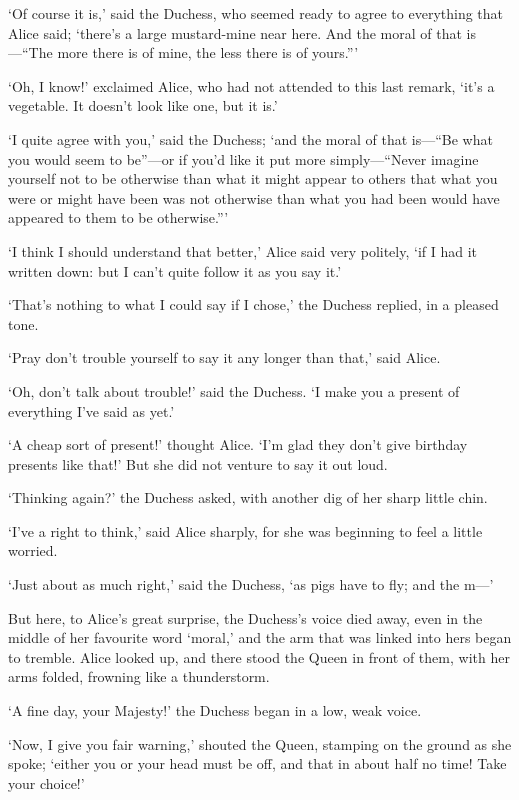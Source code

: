 \documentclass[12pt,openany]{memoir}
\begin{document}
`Of course it is,' said the Duchess, who seemed ready to agree to everything that Alice said; `there's a large mustard-mine near here. And the moral of that is---``The more there is of mine, the less there is of yours.'''

`Oh, I know!' exclaimed Alice, who had not attended to this last remark, `it's a vegetable. It doesn't look like one, but it is.'

`I quite agree with you,' said the Duchess; `and the moral of that is---``Be what you would seem to be''---or if you'd like it put more simply---``Never imagine yourself not to be otherwise than what it might appear to others that what you were or might have been was not otherwise than what you had been would have appeared to them to be otherwise.'''

`I think I should understand that better,' Alice said very politely, `if I had it written down: but I can't quite follow it as you say it.'

`That's nothing to what I could say if I chose,' the Duchess replied, in a pleased tone.

`Pray don't trouble yourself to say it any longer than that,' said Alice.

`Oh, don't talk about trouble!' said the Duchess. `I make you a present of everything I've said as yet.'

`A cheap sort of present!' thought Alice. `I'm glad they don't give birthday presents like that!' But she did not venture to say it out loud.

`Thinking again?' the Duchess asked, with another dig of her sharp little chin.

`I've a right to think,' said Alice sharply, for she was beginning to feel a little worried.

`Just about as much right,' said the Duchess, `as pigs have to fly; and the m---'

But here, to Alice's great surprise, the Duchess's voice died away, even in the middle of her favourite word `moral,' and the arm that was linked into hers began to tremble. Alice looked up, and there stood the Queen in front of them, with her arms folded, frowning like a thunderstorm.

`A fine day, your Majesty!' the Duchess began in a low, weak voice.

`Now, I give you fair warning,' shouted the Queen, stamping on the ground as she spoke; `either you or your head must be off, and that in about half no time! Take your choice!'
\end{document}
